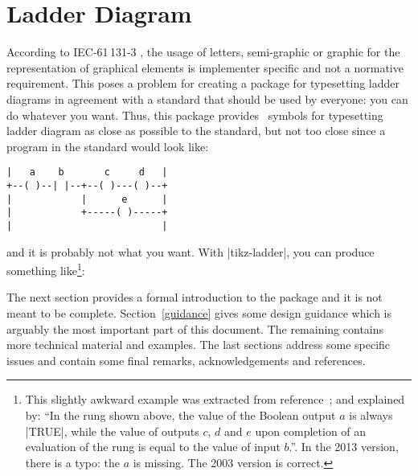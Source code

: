 \documentclass[a4paper]{ltxdoc}
\begin{document}
\section{Ladder Diagram}
According to IEC-61\,131-3 \cite[sic, p.~211]{61131}, the usage of letters, semi-graphic or graphic for the representation of graphical elements is implementer specific and not a normative requirement. This poses a problem for creating a package for typesetting ladder diagrams in agreement with a standard that should be used by everyone: you can do whatever you want. Thus, this package provides \tikzname\ symbols for typesetting ladder diagram as close as possible to the standard, but not too close since a program in the standard would look like:
\begin{center}
\begin{minipage}{5cm}
\begin{verbatim}
|   a    b       c     d   |
+--( )--| |--+--( )---( )--+
|            |      e      |
|            +-----( )-----+
|                          |
\end{verbatim}
\end{minipage}
\end{center}
and it is probably not what you want. With |tikz-ladder|, you can produce something like\footnote{This slightly awkward example was extracted from reference~\cite[p.~218]{61131}; and explained by: ``In the rung shown above, the value of the Boolean output $a$ is always |TRUE|, while the value of outputs $c$, $d$ and $e$ upon completion of an evaluation of the rung is equal to the value of input $b$.''. In the 2013 version, there is a typo: the $a$ is missing. The 2003 version is correct.}:

\begin{center}
\end{center}

The next section provides a formal introduction to the package and it is not meant to be complete. Section~\ref{guidance} gives some design guidance which is arguably the most important part of this document. The remaining contains more technical material and examples. The last sections address some specific issues and contain some final remarks, acknowledgements and references.
\end{document}
